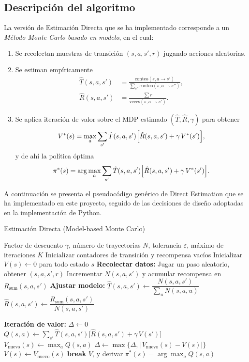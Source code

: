 \subsection{Descripción del algoritmo}

La versión de Estimación Directa que se ha implementado corresponde a un \emph{Método Monte Carlo basado en modelo}, en el cual:

\begin{enumerate}
  \item Se recolectan muestras de transición $(s,a,s',r)$ jugando acciones aleatorias.
  \item Se estiman empíricamente
    \begin{align*}
      \hat T(s,a,s') &= \frac{\mathrm{conteo}(s,a\to s')}{\sum_{s''}\mathrm{conteo}(s,a\to s'')},\\
      \hat R(s,a,s') &= \frac{\sum r}{\mathrm{veces}(s,a\to s')}.
    \end{align*}
  \item Se aplica iteración de valor sobre el MDP estimado $(\hat T,\hat R,\gamma)$ para obtener
    \[
      V^*(s) = \max_a \sum_{s'} \hat T(s,a,s')\Bigl[\hat R(s,a,s') + \gamma\,V^*(s')\Bigr],
    \]
    y de ahí la política óptima
    \[
      \pi^*(s) = \arg\max_a \sum_{s'} \hat T(s,a,s')\Bigl[\hat R(s,a,s') + \gamma\,V^*(s')\Bigr].
    \]
\end{enumerate}

A continuación se presenta el pseudocódigo genérico de Direct Estimation que se ha implementado en este proyecto, seguido de las decisiones de diseño adoptadas en la implementación de Python.

\begin{algorithm}[H]
\caption{Estimación Directa (Model-based Monte Carlo)}\label{alg:direct-estimation}
\begin{algorithmic}[1]
\Require Factor de descuento $\gamma$, número de trayectorias $N$, tolerancia $\varepsilon$, máximo de iteraciones $K$
\State Inicializar contadores de transición y recompensa vacíos
\State Inicializar $V(s)\gets 0$ para todo estado $s$
  \State \textbf{Recolectar datos:}
    \State Jugar un paso aleatorio, obtener $(s,a,s',r)$
     \State Incrementar $N(s,a,s')$ y acumular recompensa en $R_{\text{sum}}(s,a,s')$
  \EndFor
  \State \textbf{Ajustar modelo:}
    \State $\hat T(s,a,s')\gets \dfrac{N(s,a,s')}{\sum_{u}N(s,a,u)}$
    \State $\hat R(s,a,s')\gets \dfrac{R_{\text{sum}}(s,a,s')}{N(s,a,s')}$

  \EndFor
  \State \textbf{Iteración de valor:}
  \State $\Delta\gets 0$
      \State $Q(s,a)\gets \sum_{s'}\hat T(s,a,s')\bigl[\hat R(s,a,s')+\gamma\,V(s')\bigr]$
    \EndFor
    \State $V_{\text{nuevo}}(s)\gets \max_a Q(s,a)$
    \State $\Delta\gets \max\{\Delta,\,|V_{\text{nuevo}}(s)-V(s)|\}$
    \State $V(s)\gets V_{\text{nuevo}}(s)$
  \EndFor
  \If{$\Delta<\varepsilon$} \textbf{break} \EndIf
\EndFor
\State \Return $V$, y derivar $\pi^*(s)=\arg\max_a Q(s,a)$
\end{algorithmic}
\end{algorithm}

